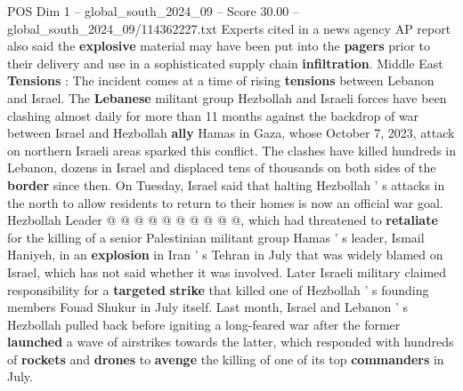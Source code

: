 \begin{textsample}{POS Dim 1 – global\_south\_2024\_09 – Score 30.00 – global\_south\_2024\_09/114362227.txt}
Experts cited in a news agency AP report also said the \textbf{explosive} material may have been put into the \textbf{pagers} prior to their delivery and use in a sophisticated supply chain \textbf{infiltration}.
Middle East \textbf{Tensions} : The incident comes at a time of rising \textbf{tensions} between Lebanon and Israel.
The \textbf{Lebanese} militant group Hezbollah and Israeli forces have been clashing almost daily for more than 11 months against the backdrop of war between Israel and Hezbollah \textbf{ally} Hamas in Gaza, whose October 7, 2023, attack on northern Israeli areas sparked this conflict.
The clashes have killed hundreds in Lebanon, dozens in Israel and displaced tens of thousands on both sides of the \textbf{border} since then.
On Tuesday, Israel said that halting Hezbollah ' s attacks in the north to allow residents to return to their homes is now an official war goal.
Hezbollah Leader @ @ @ @ @ @ @ @ @ @, which had threatened to \textbf{retaliate} for the killing of a senior Palestinian militant group Hamas ' s leader, Ismail Haniyeh, in an \textbf{explosion} in Iran ' s Tehran in July that was widely blamed on Israel, which has not said whether it was involved.
Later Israeli military claimed responsibility for a \textbf{targeted} \textbf{strike} that killed one of Hezbollah ' s founding members Fouad Shukur in July itself.
Last month, Israel and Lebanon ' s Hezbollah pulled back before igniting a long-feared war after the former \textbf{launched} a wave of airstrikes towards the latter, which responded with hundreds of \textbf{rockets} and \textbf{drones} to \textbf{avenge} the killing of one of its top \textbf{commanders} in July.

\end{textsample}
